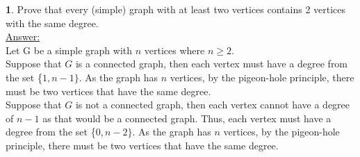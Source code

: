 \documentclass[12pt,a4paper]{article}
\theoremstyle{definition}
\newtheorem{problem}{}
\begin{document}
\begin{problem}
Prove that every (simple) graph with at least two vertices contains 2 vertices with the same degree. \\

\underline{Answer:} \\
Let G be a simple graph with $n$ vertices where $n \geq 2$. \\

Suppose that $G$ is a connected graph, then each vertex must have a degree from the set \{$1, n - 1\}$. As the graph has $n$ vertices, by the pigeon-hole principle, there must be two vertices that have the same degree. \\

Suppose that $G$ is not a connected graph, then each vertex cannot have a degree of $n - 1$ as that would be a connected graph. Thus, each vertex must have a degree from the set \{$0, n - 2\}$. As the graph has $n$ vertices, by the pigeon-hole principle, there must be two vertices that have the same degree.

\end{problem}
\end{document}
